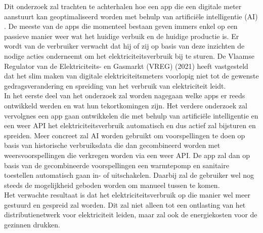 Dit onderzoek zal trachten te achterhalen hoe een app die een digitale meter aanstuurt kan geoptimaliseerd worden met behulp van artificiële intelligentie (AI) . De meeste van de  apps die momenteel bestaan geven immers enkel op een passieve manier weer wat het huidige verbuik en de huidige productie is.  Er wordt van de verbruiker verwacht dat hij of zij op basis van deze inzichten de nodige acties onderneemt om het elektriciteitsverbruik bij te sturen. De Vlaamse Regulator van de Elektriciteits- en Gasmarkt (VREG) (2021) heeft vastgesteld dat het slim maken van digitale elektriciteitsmeters voorlopig niet tot de gewenste gedragsverandering en spreiding van het verbruik van elektriciteit leidt. \\

In het eerste deel van het onderzoek zal worden nagegaan welke apps er reeds ontwikkeld werden en wat hun tekortkomingen zijn. Het verdere onderzoek zal vervolgnes een app gaan ontwikkelen die met behulp van artificiële intelligentie en een weer API het elektriciteitsverbruik automatisch en dus actief zal bijsturen en spreiden. Meer concreet zal AI worden gebruikt om voorspellingen te doen op basis van historische verbruiksdata die dan gecombineerd worden met weersvoorspellingen die verkregen worden via een weer API. De app zal dan op basis van de gecombineerde voorspellingen een warmtepomp en sanitaire toestellen automatisch gaan in- of uitschakelen. Daarbij zal de gebruiker wel nog steeds de mogelijkheid geboden worden om manueel tussen te komen. \\

Het verwachte resultaat is dat het elektriciteitsverbruik op die manier wel meer gestuurd en gespreid zal worden. Dit zal niet alleen tot een ontlasting van het distributienetwerk voor elektriciteit leiden, maar zal ook de energiekosten voor de gezinnen drukken.
